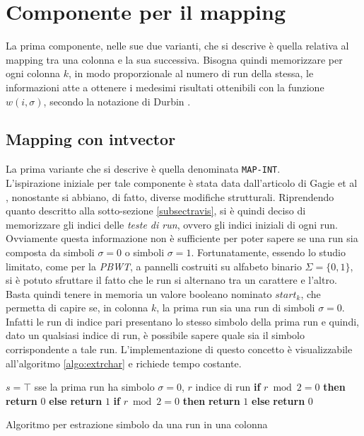 \section{Componente per il mapping}
La prima componente, nelle sue due varianti, che si descrive è quella relativa
al mapping tra una colonna e la sua successiva. Bisogna quindi memorizzare per
ogni colonna $k$, in modo proporzionale al numero di run della stessa, le
informazioni atte a ottenere i medesimi risultati ottenibili con la funzione
$w(i,\sigma)$, secondo la notazione di Durbin \cite{pbwt}. 
\subsection{Mapping con intvector}
La prima variante che si descrive è quella denominata \texttt{MAP-INT}.\\
L'ispirazione iniziale per tale componente è stata data dall'articolo di Gagie
et al \cite{tricks}, nonostante si abbiano, di fatto, diverse modifiche
strutturali. Riprendendo quanto descritto alla sotto-sezione \ref{subsectravis},
si è quindi deciso di
memorizzare gli indici delle \textit{teste di run}, ovvero gli indici iniziali
di ogni run. Ovviamente questa informazione non è sufficiente per poter sapere
se una run sia composta da simboli $\sigma=0$ o simboli
$\sigma=1$. Fortunatamente, essendo lo studio limitato, come per la
\textit{PBWT}, a pannelli costruiti su alfabeto binario $\Sigma=\{0,1\}$, si è
potuto sfruttare il fatto che le run si alternano tra un carattere e
l'altro. Basta quindi tenere in memoria un valore booleano nominato
$start_k$, che permetta di 
capire se, in colonna $k$, la prima run sia una run di simboli
$\sigma=0$. Infatti le run di 
indice pari presentano lo stesso simbolo della prima run e quindi, dato un
qualsiasi indice di run, è possibile sapere quale sia il simbolo corrispondente
a tale run. L'implementazione di questo concetto è
visualizzabile all'algoritmo \ref{algo:extrchar} e richiede tempo costante.
\begin{algorithm}
  \footnotesize
  \begin{algorithmic}[1]
    \Comment $s=\top$ sse la prima run ha simbolo $\sigma=0$, $r$ indice di run
    \State \textbf{if} $r\bmod 2 = 0$ \textbf{then} \textbf{return} $0$
    \textbf{else} \textbf{return} $1$
    \Else
    \State \textbf{if} $r\bmod 2 = 0$ \textbf{then} \textbf{return} $1$
    \textbf{else} \textbf{return} $0$
    \EndIf
    \EndFunction
  \end{algorithmic}
  \caption{Algoritmo per estrazione simbolo da una run in una colonna}
  \label{algo:extrchar}
\end{algorithm}

